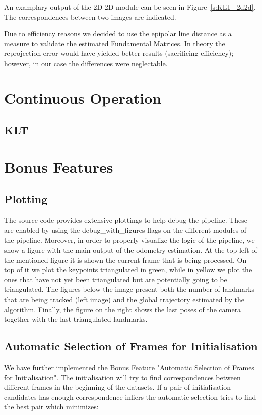 An examplary output of the 2D-2D module can be seen in Figure~\ref{s:KLT_2d2d}. The correspondences between two images are indicated.

Due to efficiency reasons we decided to use the epipolar line distance as a measure to validate the estimated Fundamental Matrices. In theory the reprojection error would have yielded better results (sacrificing efficiency); however, in our case the differences were neglectable.

\section{Continuous Operation}
\label{s:ContOp}

\subsection{KLT}

\section{Bonus Features}
\label{s:BF}

\subsection{Plotting}
The source code provides extensive plottings to help debug the pipeline. These are enabled by using the debug_with_figures flags
on the different modules of the pipeline. Moreover, in order to properly visualize the logic of the pipeline, we show a figure 
with the main output of the odometry estimation.
At the top left of the mentioned figure it is shown the current frame that is being processed. On top of it we plot the keypoints
triangulated in green, while in yellow we plot the ones that have not yet been triangulated but are potentially going to be
triangulated.
The figures below the image present both the number of landmarks that are being tracked (left image) and the global trajectory
estimated by the algorithm.
Finally, the figure on the right shows the last poses of the camera together with the last triangulated landmarks.


\subsection{Automatic Selection of Frames for Initialisation}
We have further implemented the Bonus Feature "Automatic Selection of Frames for Initialisation". The initialisation will try to find correspondences between different frames in the beginning of the datasets. If a pair of initialisation candidates has enough correspondence inliers the automatic selection tries to find the best pair which minimizes:

